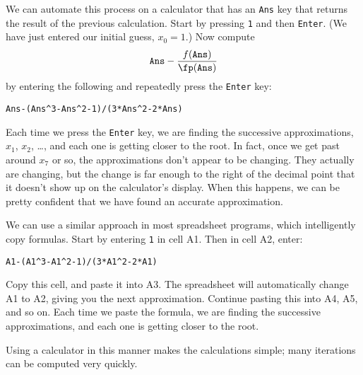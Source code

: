 We can automate this process on a calculator that has an \verb+Ans+ key that returns the result of the previous calculation.  Start by pressing \verb+1+ and then \texttt{Enter}. (We have just entered our initial guess, $x_0=1$.)  Now  compute \[\texttt{Ans}-\frac{f(\texttt{Ans})}{\fp(\texttt{Ans})}\]
by entering the following and repeatedly press the \texttt{Enter} key:
\begin{center}
\verb+Ans-(Ans^3-Ans^2-1)/(3*Ans^2-2*Ans)+
\end{center}
Each time we press the \texttt{Enter} key, we are finding the successive approximations, $x_1$, $x_2$, \dots, and each one is getting closer to the root.  In fact, once we get past around $x_7$ or so, the approximations don't appear to be changing.  They actually are changing, but the change is far enough to the right of the decimal point that it doesn't show up on the calculator's display.  When this happens, we can be pretty confident that we have found an accurate approximation.

We can use a similar approach in most spreadsheet programs, which intelligently copy formulas.  Start by entering \verb+1+ in cell A1.  Then in cell A2, enter:
\begin{center}
\verb+A1-(A1^3-A1^2-1)/(3*A1^2-2*A1)+
\end{center}
Copy this cell, and paste it into A3.  The spreadsheet will automatically change A1 to A2, giving you the next approximation.  Continue pasting this into A4, A5, and so on.  Each time we paste the formula, we are finding the successive approximations, and each one is getting closer to the root.

Using a calculator in this manner makes the calculations simple; many iterations can be computed very quickly.


